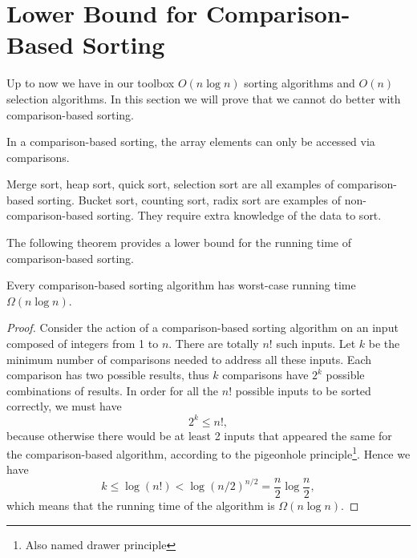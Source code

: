 \section{Lower Bound for Comparison-Based Sorting}
Up to now we have in our toolbox $O(n\log n)$ sorting algorithms and $O(n)$ selection algorithms. In this section we will prove that we cannot do better with comparison-based sorting.
\begin{definition}
In a comparison-based sorting, the array elements can only be accessed via comparisons. 
\end{definition}
Merge sort, heap sort, quick sort, selection sort are all examples of comparison-based sorting. Bucket sort, counting sort, radix sort are examples of non-comparison-based sorting. They require extra knowledge of the data to sort. 

The following theorem provides a lower bound for the running time of comparison-based sorting. 
\begin{theorem}
Every comparison-based sorting algorithm has worst-case running time $\Omega(n\log n)$.
\end{theorem}
\begin{proof}
Consider the action of a comparison-based sorting algorithm on an input composed of integers from 1 to $n$. There are totally $n!$ such inputs. Let $k$ be the minimum number of comparisons needed to address all these inputs. Each comparison has two possible results, thus $k$ comparisons have $2^k$ possible combinations of results. In order for all the $n!$ possible inputs to be sorted correctly, we must have
$$2^k\leq n!,$$
because otherwise there would be at least 2 inputs that appeared the same for the comparison-based algorithm, according to the pigeonhole principle\footnote{Also named drawer principle}. Hence we have 
$$k\leq\log(n!)<\log(n/2)^{n/2}=\frac{n}{2}\log\frac{n}{2},$$
which means that the running time of the algorithm is $\Omega(n\log n)$.


\end{proof}
\ifx\PREAMBLE\undefined

\fi
